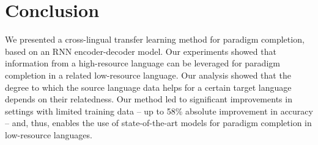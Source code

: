 \documentclass[11pt,letterpaper]{article}
\begin{document}
\section{Conclusion}
We presented a cross-lingual transfer learning
method for paradigm completion, based on an RNN encoder-decoder model.
Our experiments showed that information from a high-resource language can be
leveraged for paradigm completion in a related low-resource language.
Our analysis showed that the degree to which the source language data helps
for a certain target language depends on their relatedness. 
Our method led to significant
improvements in settings with limited training data -- up to 58\% absolute improvement in
accuracy -- and, thus, enables
the use of 
state-of-the-art models for
paradigm completion in low-resource languages.







\end{document}
